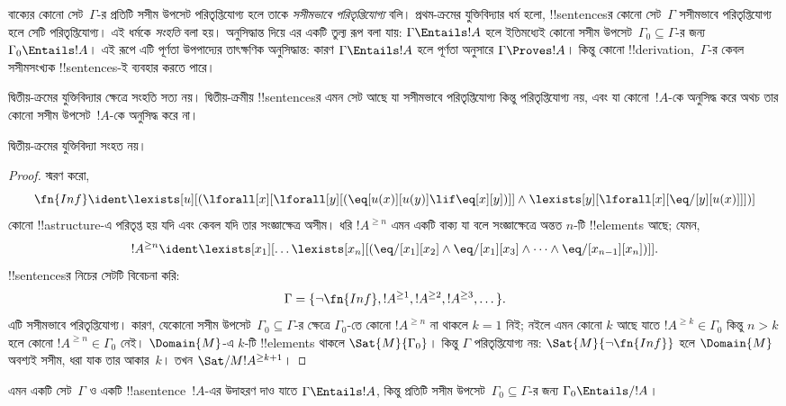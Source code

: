 \documentclass[../../../include/open-logic-section]{subfiles}
\begin{document}


\begin{explain}
বাক্যের কোনো সেট~$\Gamma$-র প্রতিটি সসীম উপসেট পরিতৃপ্তিযোগ্য
হলে তাকে \emph{সসীমভাবে পরিতৃপ্তিযোগ্য} বলি। প্রথম-ক্রমের
যুক্তিবিদ্যার ধর্ম হলো, !!{sentence}sর কোনো সেট~$\Gamma$ সসীমভাবে
পরিতৃপ্তিযোগ্য হলে সেটি পরিতৃপ্তিযোগ্য। এই ধর্মকে \emph{সংহতি} বলা হয়।
অনুসিদ্ধান্ত দিয়ে এর একটি তুল্য রূপ বলা যায়: $\Gamma \Entails !A$ হলে
ইতিমধ্যেই কোনো সসীম উপসেট~$\Gamma_0 \subseteq \Gamma$-র জন্য
$\Gamma_0 \Entails !A$। এই রূপে এটি পূর্ণতা উপপাদ্যের তাৎক্ষণিক
অনুসিদ্ধান্ত: কারণ $\Gamma \Entails !A$ হলে পূর্ণতা অনুসারে $\Gamma
\Proves !A$। কিন্তু কোনো !!{derivation},~$\Gamma$-র কেবল সসীমসংখ্যক
!!{sentence}s-ই ব্যবহার করতে পারে।

দ্বিতীয়-ক্রমের যুক্তিবিদ্যার ক্ষেত্রে সংহতি সত্য নয়। দ্বিতীয়-ক্রমীয়
!!{sentence}sর এমন সেট আছে যা সসীমভাবে পরিতৃপ্তিযোগ্য কিন্তু
পরিতৃপ্তিযোগ্য নয়, এবং যা কোনো~$!A$-কে অনুসিদ্ধ করে অথচ তার কোনো সসীম
উপসেট~$!A$-কে অনুসিদ্ধ করে না।
\end{explain}


\begin{thm}
দ্বিতীয়-ক্রমের যুক্তিবিদ্যা সংহত নয়।
\end{thm}

\begin{proof}
স্মরণ করো,
\[
\fn{Inf} \ident \lexists[u][(\lforall[x][\lforall[y][(\eq[u(x)][u(y)]
      \lif \eq[x][y])]] \land \lexists[y][\lforall[x][\eq/[y][u(x)]]])]
\]
কোনো !!a{structure}-এ পরিতৃপ্ত হয় যদি এবং কেবল যদি তার সংজ্ঞাক্ষেত্র
অসীম। ধরি $!A^{\ge n}$ এমন একটি বাক্য যা বলে সংজ্ঞাক্ষেত্রে অন্তত
$n$-টি !!{element}s আছে; যেমন,
\[
!A^{\ge n} \ident \lexists[x_1][\dots\lexists[x_n][(\eq/[x_1][x_2]
    \land \eq/[x_1][x_3] \land \dots \land \eq/[x_{n-1}][x_n])]].
\]
!!{sentence}sর নিচের সেটটি বিবেচনা করি:
\[
\Gamma = \{\lnot \fn{Inf}, !A^{\ge 1}, !A^{\ge 2}, !A^{\ge 3}, \dots\}.
\]
এটি সসীমভাবে পরিতৃপ্তিযোগ্য। কারণ, যেকোনো সসীম উপসেট~$\Gamma_0
\subseteq \Gamma$-র ক্ষেত্রে $\Gamma_0$-তে কোনো $!A^{\ge n}$ না থাকলে
$k=1$ নিই; নইলে এমন কোনো $k$ আছে যাতে $!A^{\ge k} \in \Gamma_0$ কিন্তু
$n>k$ হলে কোনো $!A^{\ge n} \in \Gamma_0$ নেই।
$\Domain{M}$-এ $k$-টি !!{element}s থাকলে $\Sat{M}{\Gamma_0}$। কিন্তু
$\Gamma$ পরিতৃপ্তিযোগ্য নয়: $\Sat{M}{\lnot \fn{Inf}}$ হলে
$\Domain{M}$ অবশ্যই সসীম, ধরা যাক তার আকার~$k$। তখন
$\Sat/{M}{!A^{\ge k+1}}$।
\end{proof}

\begin{prob}
এমন একটি সেট~$\Gamma$ ও একটি !!a{sentence}~$!A$-এর উদাহরণ দাও যাতে
$\Gamma \Entails !A$, কিন্তু প্রতিটি সসীম উপসেট~$\Gamma_0 \subseteq
\Gamma$-র জন্য $\Gamma_0 \Entails/ !A$।
\end{prob}
\end{document}
